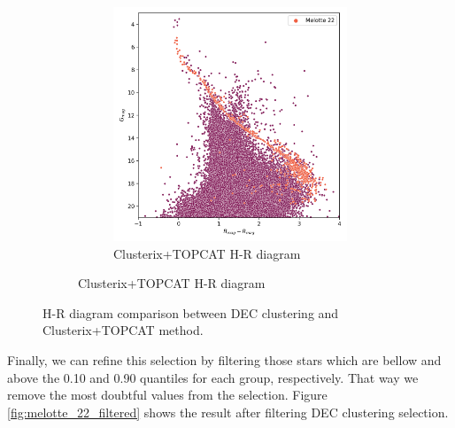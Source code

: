 \documentclass[11pt, a4paper, english]{book}
\begin{document}
\begin{figure}[htbp]
\begin{subfigure}{0.9\textwidth}
\begin{subfigure}[t]{0.45\textwidth}
      \includegraphics[width=\textwidth]{../figures/melotte_22/hr_diagram_melotte_22.png}
      \caption{Clusterix+TOPCAT H-R diagram}
    \end{subfigure}
  \end{subfigure}
  \caption{H-R diagram comparison between DEC clustering and Clusterix+TOPCAT method.}
  \label{fig:hr_diagram_comparison}
\end{figure}

Finally, we can refine this selection by filtering those stars which are bellow and above
the 0.10 and 0.90 quantiles for each group, respectively.
That way we remove the most doubtful values from the selection.
Figure \ref{fig:melotte_22_filtered} shows the result after filtering DEC clustering selection.
\end{document}
